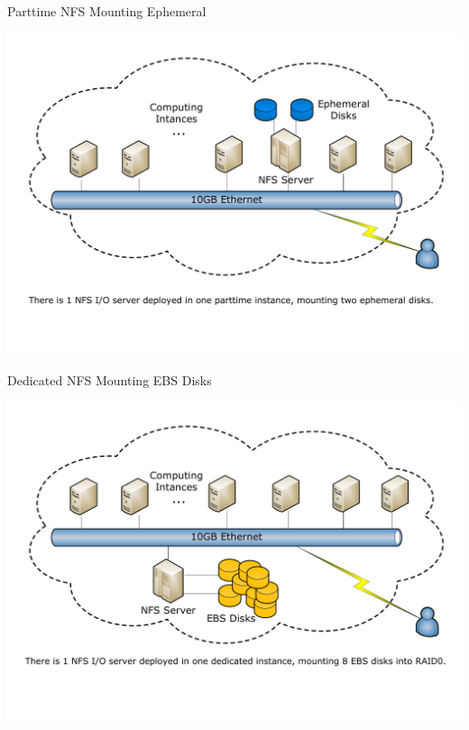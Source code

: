 \documentclass{beamer}
\begin{document}
\begin{frame}{Parttime NFS Mounting Ephemeral}
    \begin{center}
        \includegraphics[width=\textwidth]{figures/visio/nfs-ephemeral-part.pdf}
    \end{center}
\end{frame}

\begin{frame}{Dedicated NFS Mounting EBS Disks}
    \begin{center}
        \includegraphics[width=\textwidth]{figures/visio/nfs-ebs.pdf}
    \end{center}
\end{frame}
\end{document}
